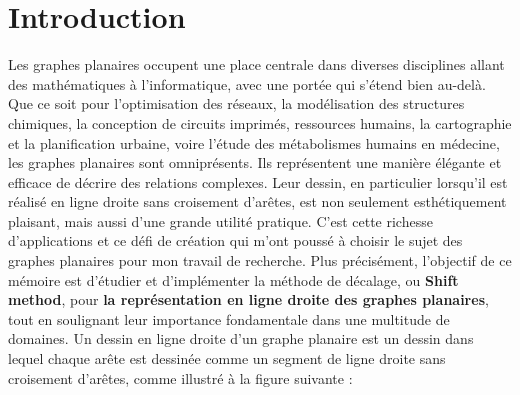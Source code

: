 \documentclass[hidelinks,letterpaper,12pt]{article}
\begin{document}
\section{Introduction}
\label{Introduction}
Les graphes planaires occupent une place centrale dans diverses disciplines allant des mathématiques à l'informatique, avec une portée qui s'étend bien au-delà. Que ce soit pour l'optimisation des réseaux, la modélisation des structures chimiques, la conception de circuits imprimés, ressources humains, la cartographie et la planification urbaine, voire l'étude des métabolismes humains en médecine, les graphes planaires sont omniprésents. Ils représentent une manière élégante et efficace de décrire des relations complexes. Leur dessin, en particulier lorsqu'il est réalisé en ligne droite sans croisement d'arêtes, est non seulement esthétiquement plaisant, mais aussi d'une grande utilité pratique. C'est cette richesse d'applications et ce défi de création qui m'ont poussé à choisir le sujet des graphes planaires pour mon travail de recherche. Plus précisément, l'objectif de ce mémoire est d'étudier et d'implémenter la méthode de décalage, ou \textbf{Shift method}, pour \textbf{la représentation en ligne droite des graphes planaires}, tout en soulignant leur importance fondamentale dans une multitude de domaines. Un dessin en ligne droite d'un graphe planaire est un dessin dans lequel chaque arête est dessinée comme un segment de ligne droite sans croisement d'arêtes, comme illustré à la figure suivante : 
\begin{figure}[H]
\centering
{}
\label{Dessin en ligne droite d'un graphe planaire}	
\end{figure}
\end{document}
